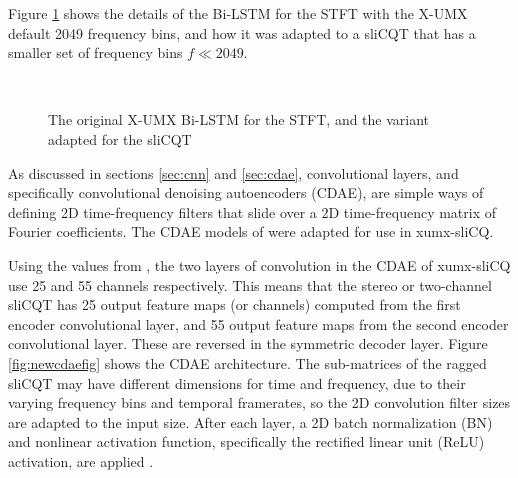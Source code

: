 \documentclass[report.tex]{subfiles}
\begin{document}
Figure \ref{fig:umxnetworkdetails} shows the details of the Bi-LSTM for the STFT with the X-UMX default 2049 frequency bins, and how it was adapted to a sliCQT that has a smaller set of frequency bins $f \ll 2049$.

\begin{figure}[ht]
	\centering
	\\
	\caption{The original X-UMX Bi-LSTM for the STFT, and the variant adapted for the sliCQT}
	\label{fig:umxnetworkdetails}
\end{figure}

As discussed in sections \ref{sec:cnn} and \ref{sec:cdae}, convolutional layers, and specifically convolutional denoising autoencoders (CDAE), are simple ways of defining 2D time-frequency filters that slide over a 2D time-frequency matrix of Fourier coefficients. The CDAE models of \textcite{plumbley1, plumbley2} were adapted for use in xumx-sliCQ.

Using the values from \textcite{plumbley2}, the two layers of convolution in the CDAE of xumx-sliCQ use 25 and 55 channels respectively. This means that the stereo or two-channel sliCQT has 25 output feature maps (or channels) computed from the first encoder convolutional layer, and 55 output feature maps from the second encoder convolutional layer. These are reversed in the symmetric decoder layer. Figure \ref{fig:newcdaefig} shows the CDAE architecture. The sub-matrices of the ragged sliCQT may have different dimensions for time and frequency, due to their varying frequency bins and temporal framerates, so the 2D convolution filter sizes are adapted to the input size. After each layer, a 2D batch normalization (BN) and nonlinear activation function, specifically the rectified linear unit (ReLU) activation, are applied \parencite{plumbley2}.
\end{document}
